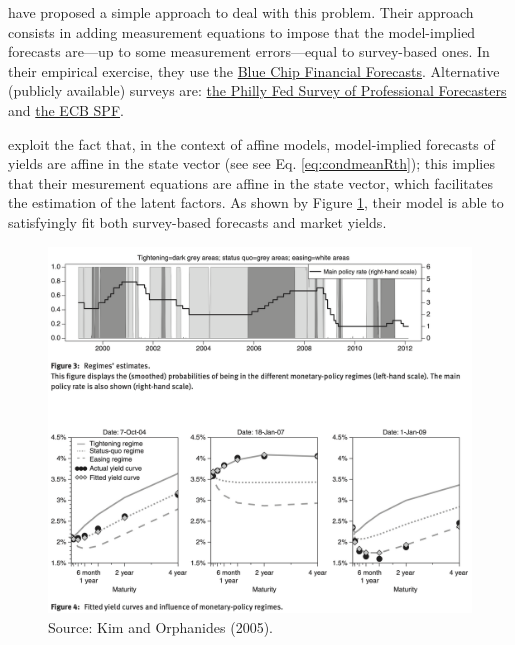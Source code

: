 \documentclass[
  12pt,
]{book}
\theoremstyle{definition}
\theoremstyle{definition}
\theoremstyle{definition}
\theoremstyle{definition}
\theoremstyle{remark}
\begin{document}
\citet{Kim_Orphanides_2005} have proposed a simple approach to deal with this problem. Their approach consists in adding measurement equations to impose that the model-implied forecasts are---up to some measurement errors---equal to survey-based ones. In their empirical exercise, they use the \href{https://lrus.wolterskluwer.com/store/products/blue-chip-financial-forecasts-prod-ss07418345/paperback-item-1-ss07418345}{Blue Chip Financial Forecasts}. Alternative (publicly available) surveys are: \href{https://www.philadelphiafed.org/research-and-data/real-time-center/survey-of-professional-forecasters}{the Philly Fed Survey of Professional Forecasters} and \href{https://www.ecb.europa.eu/stats/ecb_surveys/survey_of_professional_forecasters/html/index.en.html}{the ECB SPF}.

\citet{Kim_Orphanides_2005} exploit the fact that, in the context of affine models, model-implied forecasts of yields are affine in the state vector (see see Eq. \eqref{eq:condmeanRth}); this implies that their mesurement equations are affine in the state vector, which facilitates the estimation of the latent factors. As shown by Figure \ref{fig:figKimOrph}, their model is able to satisfyingly fit both survey-based forecasts and market yields.

\begin{figure}

{\centering \includegraphics[width=0.95\linewidth]{figures/Fig-SNDE} 

}

\caption{Source: Kim and Orphanides (2005).}\label{fig:figKimOrph}
\end{figure}
\end{document}
